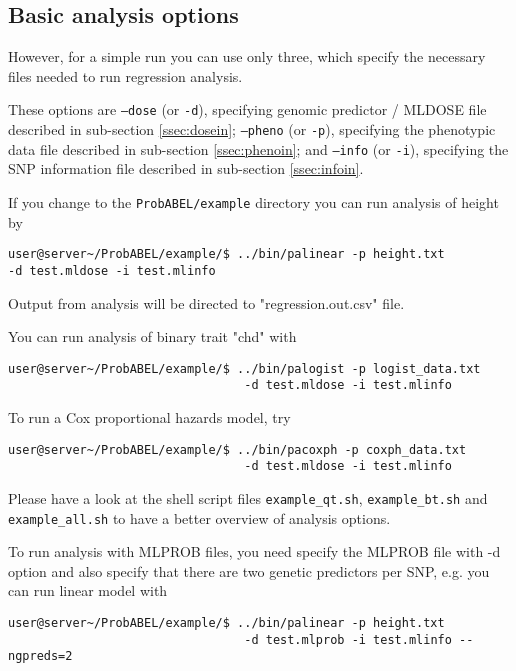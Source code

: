\documentclass[12pt]{article}
\begin{document}
\subsection{Basic analysis options}
However, for 
a simple run you can use only three, which specify the necessary files 
needed to run regression analysis.

These options are 
\texttt{--dose} (or \texttt{-d}), 
specifying genomic predictor / MLDOSE file described in sub-section \ref{ssec:dosein};
\texttt{--pheno} (or \texttt{-p}), 
specifying the phenotypic data file described in sub-section \ref{ssec:phenoin}; and
\texttt{--info} (or \texttt{-i}), 
specifying the SNP information file described in sub-section \ref{ssec:infoin}.

If you change to the \texttt{ProbABEL/example} directory you can run analysis of 
height by 

\begin{verbatim}
user@server~/ProbABEL/example/$ ../bin/palinear -p height.txt 
-d test.mldose -i test.mlinfo
\end{verbatim}

Output from analysis will be directed to "regression.out.csv" file.

You can run analysis of binary trait "chd" with 

\begin{verbatim}
user@server~/ProbABEL/example/$ ../bin/palogist -p logist_data.txt 
                                 -d test.mldose -i test.mlinfo
\end{verbatim}

To run a Cox proportional hazards model, try 

\begin{verbatim}
user@server~/ProbABEL/example/$ ../bin/pacoxph -p coxph_data.txt 
                                 -d test.mldose -i test.mlinfo
\end{verbatim}

Please have a look at the shell script files \texttt{example\_qt.sh}, 
\texttt{example\_bt.sh} and \texttt{example\_all.sh} to have 
a better overview of analysis options.

To run analysis with MLPROB files, you need specify the MLPROB file 
with -d option and also specify that there are two genetic predictors 
per SNP, e.g. you can run linear model with

\begin{verbatim}
user@server~/ProbABEL/example/$ ../bin/palinear -p height.txt 
                                 -d test.mlprob -i test.mlinfo --ngpreds=2
\end{verbatim}
\end{document}
